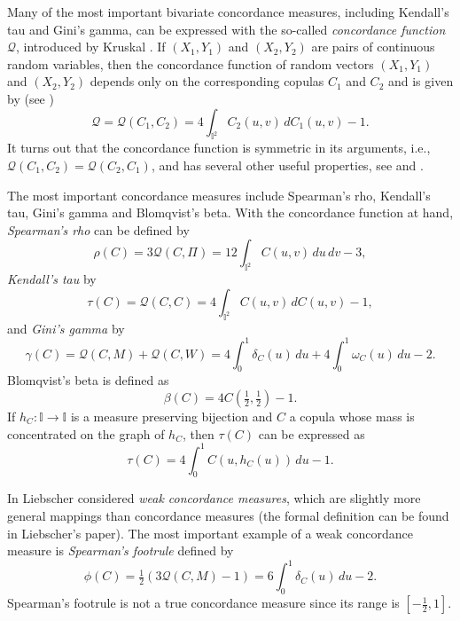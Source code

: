 \documentclass[12pt,a4paper]{amsart}
\theoremstyle{definition}
\newcommand{\II}{\mathbb{I}}
\newcommand{\cQ}{\mathcal{Q}}
\begin{document}
Many of the most important bivariate concordance measures, including Kendall's tau and Gini's gamma, can be expressed with the so-called \emph{concordance function} $\cQ$, introduced by Kruskal \cite{Krus}.
If $(X_1,Y_1)$ and $(X_2,Y_2)$ are pairs of continuous random variables,
then the concordance function of random vectors $(X_1,Y_1)$ and $(X_2,Y_2)$ depends only on the corresponding copulas $C_1$ and $C_2$ and is given by (see \cite[Theorem 5.1.1]{Nels})
\begin{equation}\label{concordance} \cQ=\cQ(C_1,C_2)= 4 \int_{\II ^2} C_2(u,v) \, dC_1(u,v) -1.
\end{equation}
It turns out that the concordance function is symmetric in its arguments, i.e., $\cQ(C_1,C_2)=\cQ(C_2,C_1)$, and has several other useful properties, see \cite[Corollary 5.1.2]{Nels} and \cite[\S{3}]{KoBuKoMoOm2}.

The most important concordance measures include Spearman's rho, Kendall's tau, Gini's gamma and Blomqvist's beta. 
With the concordance function at hand, \textit{Spearman's rho} can be defined by
\begin{equation}\label{rho}
\rho(C)=3\cQ(C,\Pi)= 12\int_{\II ^2} C(u,v) \, du \, dv - 3,
\end{equation}
\textit{Kendall's tau} by
\begin{equation}\label{tau}
\tau(C)=\cQ(C,C)= 4\int_{\II ^2} C(u,v) \, dC(u,v) - 1,
\end{equation}
and \textit{Gini's gamma} by
\begin{equation}\label{gamma}
\gamma(C)=\cQ(C,M)+\cQ(C,W) = 4\int_0^1 \delta_C(u) \, du + 4\int_0^1 \omega_C(u) \, du - 2.
\end{equation}
Blomqvist's beta is defined as 
\begin{equation}\label{beta}
\beta(C)=4C(\tfrac12,\tfrac12)- 1.
\end{equation}
If $h_C \colon \II \to \II$ is a measure preserving bijection and $C$ a copula whose mass is concentrated on the graph of $h_C$, then $\tau(C)$ can be expressed as 
\begin{equation}\label{eq:tau-h}
\tau(C)=4\int_0^1 C(u,h_C(u)) \, du - 1.
\end{equation}

In \cite{Lieb} Liebscher considered \textit{weak concordance measures}, which are slight\-ly more general mappings than concordance measures (the formal definition can be found in Liebscher's paper).
The most important example of a weak concordance measure is \textit{Spearman's footrule} defined by
\begin{equation}\label{phi}
\phi(C)=\tfrac12\left(3\cQ(C,M)-1\right)=6\int_0^1 \delta_C(u) \, du - 2.
\end{equation}
Spearman's footrule is not a true concordance measure since its range is $[-\frac12,1]$.
\end{document}
